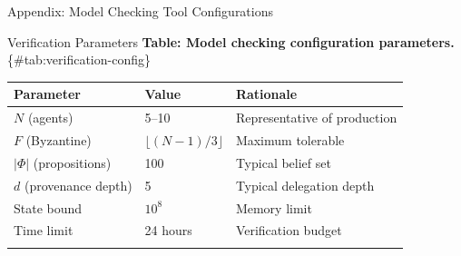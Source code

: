\documentclass[
  ignorenonframetext,
]{beamer}
\newcounter{none} %
\begin{document}
\begin{frame}[fragile]{Appendix: Model Checking Tool Configurations}
\begin{block}{Verification Parameters}
\textbf{Table: Model checking configuration parameters.}
\{\#tab:verification-config\}

{\def\LTcaptype{none} %
\begin{longtable}[]{@{}lll@{}}
\toprule\noalign{}
Parameter & Value & Rationale \\
\midrule\noalign{}
\endhead
\(N\) (agents) & 5--10 & Representative of production \\
\(F\) (Byzantine) & \(\lfloor (N-1)/3 \rfloor\) & Maximum tolerable \\
\(|\Phi|\) (propositions) & 100 & Typical belief set \\
\(d\) (provenance depth) & 5 & Typical delegation depth \\
State bound & \(10^8\) & Memory limit \\
Time limit & 24 hours & Verification budget \\
\bottomrule\noalign{}
\end{longtable}
}
\end{block}
\end{frame}
\end{document}
